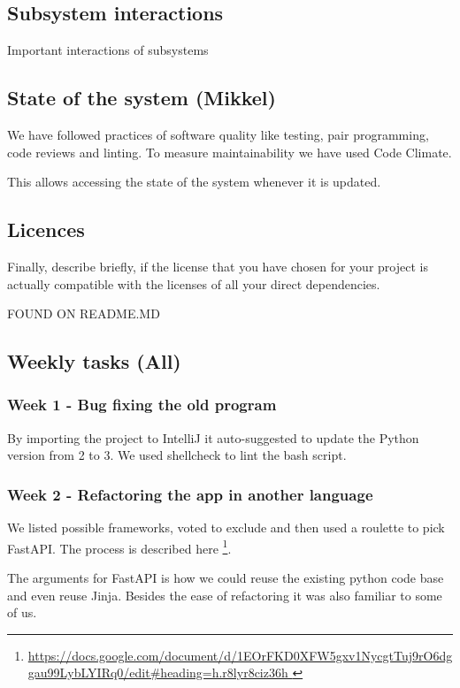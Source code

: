\documentclass{article}
\begin{document}
\subsection{Subsystem interactions}

Important interactions of subsystems

\subsection{State of the system (Mikkel)}
We have followed practices of software quality like testing, pair programming, code reviews and linting. To measure maintainability we have used Code Climate.

This allows accessing the state of the system whenever it is updated.

\subsection{Licences}
Finally, describe briefly, if the license that you have chosen for your project is actually compatible with the licenses of all your direct dependencies.

FOUND ON README.MD

\subsection{Weekly tasks (All) }


\subsubsection{Week 1 - Bug fixing the old program}
By importing the project to IntelliJ it auto-suggested to update the Python version from 2 to 3. We used shellcheck to lint the bash script.

\subsubsection{Week 2 - Refactoring the app in another language }

We listed possible frameworks, voted to exclude and then used a roulette to pick FastAPI. The process is described here \footnote{\url{https://docs.google.com/document/d/1EOrFKD0XFW5gxv1NycgtTuj9rO6dggau99LybLYIRq0/edit#heading=h.r8lyr8ciz36h }}. 

The arguments for FastAPI is how we could reuse the existing python code base and even reuse Jinja. Besides the ease of refactoring it was also familiar to some of us. 
\end{document}
